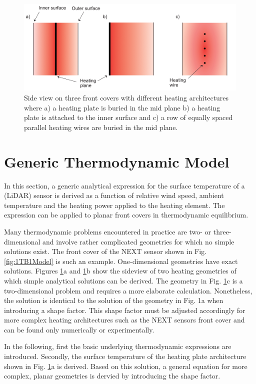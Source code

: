 \begin{figure} [H]
	\centering
	\includegraphics[scale=0.75]{Pictures/FrontCoverTypes.png}
	\caption[Heating Architectures]{Side view on three front covers with different heating architectures where a) a heating plate is buried in the mid plane b) a heating plate is attached to the inner surface and c) a row of equally spaced parallel heating wires are buried in the mid plane.}
	\label{fig:examples}
\end{figure}


\section{Generic Thermodynamic Model}
In this section, a generic analytical expression for the surface temperature of a (LiDAR) sensor is derived as a function of relative wind speed, ambient temperature and the heating power applied to the heating element. The expression can be applied to planar front covers in thermodynamic equilibrium. 

Many thermodynamic problems encountered in practice are two- or three-dimensional and involve rather complicated geometries for which no simple solutions exist. The front cover of the NEXT sensor shown in Fig. \ref{fig:1TB1Model} is such an example. One-dimensional geometries have exact solutions. Figures \ref{fig:examples}a and \ref{fig:examples}b show the sideview of two heating geometries of which simple analytical solutions can be derived. The geometry in Fig. \ref{fig:examples}c is a two-dimensional problem and requires a more elaborate calculation. Nonetheless, the solution is identical to the solution of the geometry in Fig. 1a when introducing a shape factor. This shape factor must be adjusted accordingly for more complex heating architectures such as the NEXT sensors front cover and can be found only numerically or experimentally. 

In the following, first the basic underlying thermodynamic expressions are introduced. Secondly, the surface temperature of the heating plate architecture shown in Fig. \ref{fig:examples}a is derived. Based on this solution, a general equation for more complex, planar geometries is dervied by introducing the shape factor.

